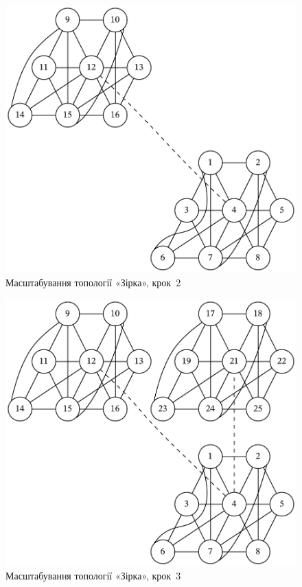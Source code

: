\documentclass[
	a4paper,
	oneside,
	BCOR = 10mm,
	DIV = 12,
	12pt,
	headings = normal,
]{scrartcl}
\begin{document}
				\begin{figure}[!htbp]
					\centering
					\includegraphics[height=12\baselineskip]{./assets/cluster-08-03-star-s02.pdf}
					\caption{Масштабування топології «Зірка», крок~2}
					\label{fig:cluster-08-03-star-s02}
				\end{figure}

				\begin{figure}[!htbp]
					\centering
					\includegraphics[height=12\baselineskip]{./assets/cluster-08-03-star-s03.pdf}
					\caption{Масштабування топології «Зірка», крок~3}
					\label{fig:cluster-08-03-star-s03}
				\end{figure}
\end{document}
